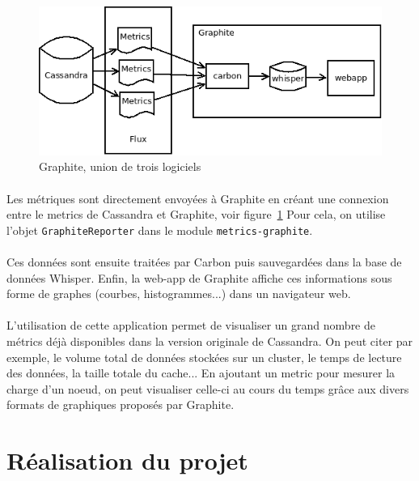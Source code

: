 \documentclass[12pt]{article}
\newcommand{\class}[1]{\texttt{#1}}
\begin{document}
\begin{figure}[h]
	\centering
		\includegraphics[width=12cm]{images/client/graphite.png}
	\caption{Graphite, union de trois logiciels \label{fig:client_visu}}
\end{figure}


\paragraph{} Les métriques sont directement envoyées à Graphite en créant une connexion entre le metrics de Cassandra et Graphite, voir figure~\ref{fig:client_visu}
Pour cela, on utilise l'objet \class{GraphiteReporter} dans le module \class{metrics-graphite}.

\paragraph{} Ces données sont ensuite traitées par Carbon puis sauvegardées dans la base de données Whisper.
Enfin, la web-app de Graphite affiche ces informations sous forme de graphes (courbes, histogrammes...) dans un navigateur web.

\paragraph{} L'utilisation de cette application permet de visualiser un grand nombre de métrics déjà disponibles dans la version originale de Cassandra.
On peut citer par exemple, le volume total de données stockées sur un cluster, le temps de lecture des données, la taille totale du cache...
En ajoutant un metric pour mesurer la charge d'un noeud, on peut visualiser celle-ci au cours du temps grâce aux divers formats de graphiques proposés par Graphite.


\newpage 
\section{Réalisation du projet}
\end{document}
